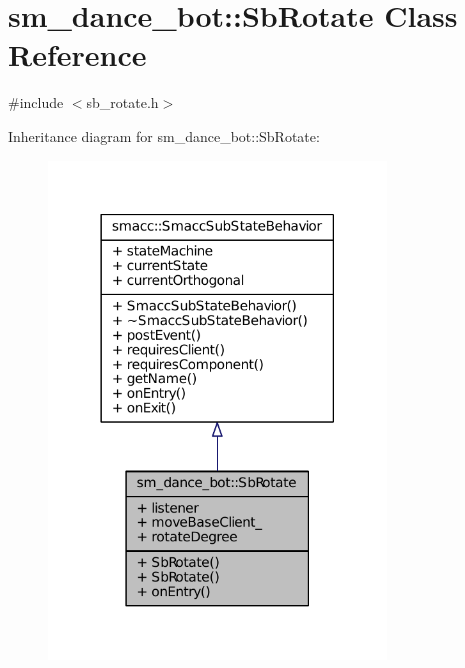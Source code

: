 \hypertarget{classsm__dance__bot_1_1SbRotate}{}\section{sm\+\_\+dance\+\_\+bot\+:\+:Sb\+Rotate Class Reference}
\label{classsm__dance__bot_1_1SbRotate}


{\ttfamily \#include $<$sb\+\_\+rotate.\+h$>$}



Inheritance diagram for sm\+\_\+dance\+\_\+bot\+:\+:Sb\+Rotate\+:
\nopagebreak
\begin{figure}[H]
\begin{center}
\leavevmode
\includegraphics[width=254pt]{classsm__dance__bot_1_1SbRotate__inherit__graph}
\end{center}
\end{figure}


